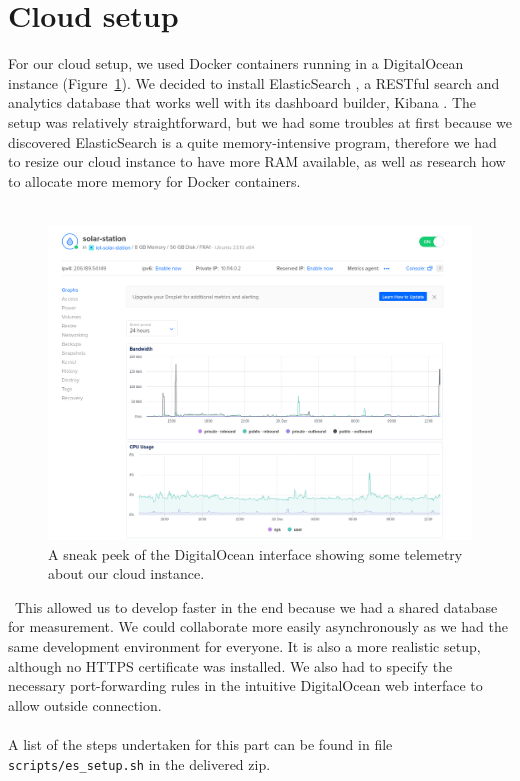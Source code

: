 \section*{Cloud setup}

For our cloud setup, we used Docker \cite{docker} containers running in a DigitalOcean \cite{do} instance (Figure~\ref{fig:do}).
We decided to install ElasticSearch \cite{es}, a RESTful search and analytics database that works well with its dashboard builder, Kibana \cite{kibana}.
The setup was relatively straightforward, but we had some troubles at first because we discovered ElasticSearch is a quite memory-intensive program, therefore we had to resize our cloud instance to have more RAM available, as well as research how to allocate more memory for Docker containers. \\ \\
\begin{figure}[H]
    \centering
    \includegraphics[width=\textwidth]{../assets/png/digital-ocean-graph}
    \caption{A sneak peek of the DigitalOcean interface showing some telemetry about our cloud instance.}
    \label{fig:do}
\end{figure}\
This allowed us to develop faster in the end because we had a shared database for measurement.
We could collaborate more easily asynchronously as we had the same development environment for everyone.
It is also a more realistic setup, although no HTTPS certificate was installed.
We also had to specify the necessary port-forwarding rules in the intuitive DigitalOcean web interface to allow outside connection. \\ \\
A list of the steps undertaken for this part can be found in file \texttt{scripts/es\_setup.sh} in the delivered zip.

